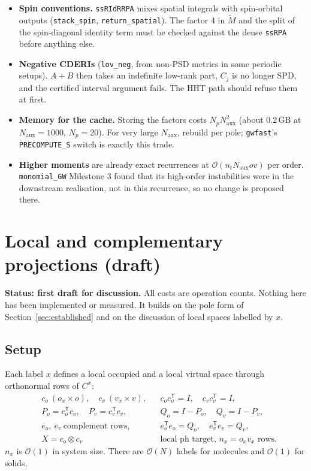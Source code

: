 \documentclass[11pt,a4paper]{article}
\newcommand{\code}[1]{\texttt{\small #1}}
\newcommand{\Naux}{N_{\mathrm{aux}}}
\newcommand{\nt}{n_{t}}
\newcommand{\Np}{N_{p}}
\newcommand{\ov}{ov}
\newcommand{\Mt}{\tilde{M}}
\begin{document}
\begin{itemize}
  \item \textbf{Spin conventions.} \code{ssRIdRRPA} mixes spatial integrals with spin-orbital
        outputs (\code{stack\_spin}, \code{return\_spatial}). The factor 4 in $\Mt$ and the split
        of the spin-diagonal identity term must be checked against the dense \code{ssRPA} before
        anything else.
  \item \textbf{Negative CDERIs} (\code{lov\_neg}, from non-PSD metrics in some periodic setups).
        $A+B$ then takes an indefinite low-rank part, $C_j$ is no longer SPD, and the certified
        interval argument fails. The HHT path should refuse them at first.
  \item \textbf{Memory for the cache.} Storing the factors costs $\Np\Naux^2$ (about 0.2\,GB at
        $\Naux=1000$, $\Np=20$). For very large $\Naux$, rebuild per pole; \code{gwfast}'s
        \code{PRECOMPUTE\_S} switch is exactly this trade.
  \item \textbf{Higher moments} are already exact recurrences at $\mathcal{O}(\nt\Naux\ov)$ per
        order. \code{monomial\_GW} Milestone 3 found that its high-order instabilities were in
        the downstream realisation, not in this recurrence, so no change is proposed there.
\end{itemize}

\section{Local and complementary projections (draft)}\label{sec:local}

\noindent\textbf{Status: first draft for discussion.} All costs are operation counts. Nothing
here has been implemented or measured. It builds on the pole form of
Section~\ref{sec:established} and on the discussion of local spaces labelled by $x$.

\subsection{Setup}

Each label $x$ defines a local occupied and a local virtual space through orthonormal rows of
$C^x$:
\begin{equation}
\begin{aligned}
  &c_o\ (o_x\times o),\quad c_v\ (v_x\times v), && c_oc_o^{\mathsf T}=I,\quad c_vc_v^{\mathsf T}=I,\\
  &P_o=c_o^{\mathsf T}c_o,\quad P_v=c_v^{\mathsf T}c_v, && Q_o=I-P_o,\quad Q_v=I-P_v,\\
  &e_o,\ e_v\ \text{complement rows}, && e_o^{\mathsf T}e_o=Q_o,\quad e_v^{\mathsf T}e_v=Q_v,\\
  &X=c_o\otimes c_v && \text{local ph target, } n_x=o_xv_x \text{ rows}.
\end{aligned}
\end{equation}
$n_x$ is $\mathcal{O}(1)$ in system size. There are $\mathcal{O}(N)$ labels for molecules and
$\mathcal{O}(1)$ for solids.
\end{document}
